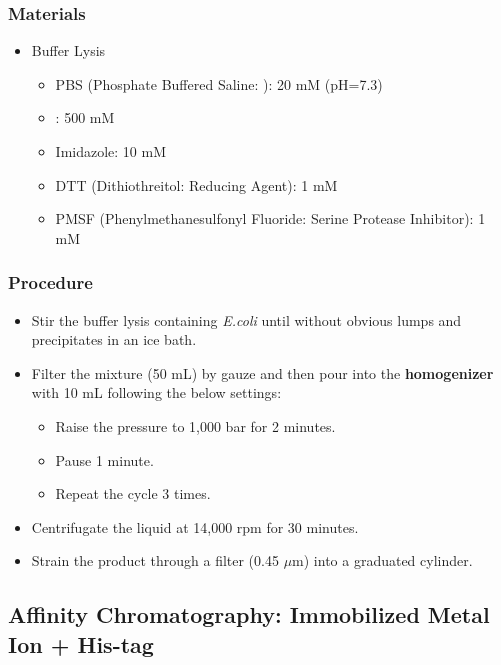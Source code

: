 \documentclass{report}
\begin{document}
\subsubsection{Materials}
\begin{itemize}
    \item Buffer Lysis
    \begin{itemize}
        \item PBS (Phosphate Buffered Saline: ): 20 mM (pH=7.3)
        \item {}: 500 mM
        \item Imidazole: 10 mM
        \item DTT (Dithiothreitol: Reducing Agent): 1 mM
        \item PMSF (Phenylmethanesulfonyl Fluoride: Serine Protease Inhibitor): 1 mM
    \end{itemize}
\end{itemize}
\subsubsection{Procedure}
\begin{itemize}
    \item Stir the buffer lysis containing \textit{E.coli} until without obvious lumps and precipitates in an ice bath.
    \item Filter the mixture (50 mL) by gauze and then pour into the \textbf{homogenizer}\cite{Homogenization} with 10 mL  following the below settings:
    \begin{itemize}
        \item Raise the pressure to 1,000 bar for 2 minutes.
        \item Pause 1 minute.
        \item Repeat the cycle 3 times.
    \end{itemize}
    \item Centrifugate the liquid at 14,000 rpm for 30 minutes.
    \item Strain the product through a filter (0.45 $\mu$m) into a graduated cylinder.
\end{itemize}
\subsection{Affinity Chromatography: Immobilized  Metal Ion + His-tag}
\end{document}
